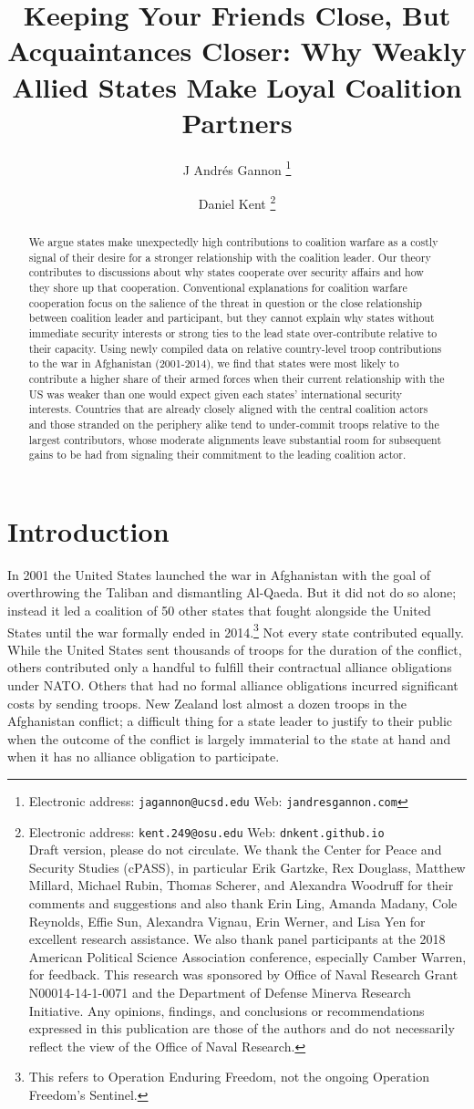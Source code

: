\documentclass[12pt,letterpaper]{article}
\title{Keeping Your Friends Close, But Acquaintances Closer: Why Weakly Allied States Make Loyal Coalition Partners}
\author{J Andr\'{e}s Gannon%
	\thanks{Electronic address: \texttt{jagannon@ucsd.edu} Web: \texttt{jandresgannon.com}}}
\affil{Department of Political Science \\ University of California, San Diego}
\author{Daniel Kent%
	\thanks{Electronic address: \texttt{kent.249@osu.edu} Web: \texttt{dnkent.github.io} \\ Draft version, please do not circulate. We thank the Center for Peace and Security Studies (cPASS), in particular Erik Gartzke, Rex Douglass, Matthew Millard, Michael Rubin, Thomas Scherer, and Alexandra Woodruff for their comments and suggestions and also thank Erin Ling, Amanda Madany, Cole Reynolds, Effie Sun, Alexandra Vignau, Erin Werner, and Lisa Yen for excellent research assistance. We also thank panel participants at the 2018 American Political Science Association conference, especially Camber Warren, for feedback. This research was sponsored by Office of Naval Research Grant N00014-14-1-0071 and the Department of Defense Minerva Research Initiative. Any opinions, findings, and conclusions or recommendations expressed in this publication are those of the authors and do not necessarily reflect the view of the Office of Naval Research.}}
\affil{Department of Political Science \\ The Ohio State University}
\begin{document}
	
\begin{singlespace}
\maketitle

\begin{abstract}
We argue states make unexpectedly high contributions to coalition warfare as a costly signal of their desire for a stronger relationship with the coalition leader. Our theory contributes to discussions about why states cooperate over security affairs and how they shore up that cooperation. Conventional explanations for coalition warfare cooperation focus on the salience of the threat in question or the close relationship between coalition leader and participant, but they cannot explain why states without immediate security interests or strong ties to the lead state over-contribute relative to their capacity. Using newly compiled data on relative country-level troop contributions to the war in Afghanistan (2001-2014), we find that states were most likely to contribute a higher share of their armed forces when their current relationship with the US was weaker than one would expect given each states' international security interests. Countries that are already closely aligned with the central coalition actors and those stranded on the periphery alike tend to under-commit troops relative to the largest contributors, whose moderate alignments leave substantial room for subsequent gains to be had from signaling their commitment to the leading coalition actor.
\end{abstract}
\end{singlespace}

\section{Introduction}
	In 2001 the United States launched the war in Afghanistan with the goal of overthrowing the Taliban and dismantling Al-Qaeda. But it did not do so alone; instead it led a coalition of 50 other states that fought alongside the United States until the war formally ended in 2014.\footnote{This refers to Operation Enduring Freedom, not the ongoing Operation Freedom's Sentinel.} Not every state contributed equally. While the United States sent thousands of troops for the duration of the conflict, others contributed only a handful to fulfill their contractual alliance obligations under NATO. Others that had no formal alliance obligations incurred significant costs by sending troops. New Zealand lost almost a dozen troops in the Afghanistan conflict; a difficult thing for a state leader to justify to their public when the outcome of the conflict is largely immaterial to the state at hand and when it has no alliance obligation to participate.
\end{document}
